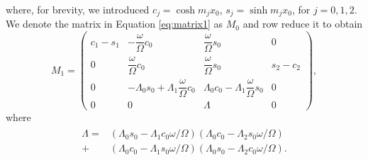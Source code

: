 %
where, for brevity, we introduced $c_j = \cosh m_j x_0$, $s_j = \sinh m_j x_0$, for $j = 0,1,2$.
We denote the matrix in Equation \eqref{eq:matrix1} as $M_0$ and row reduce it to obtain
%
\begin{equation}
\label{eq:matrix2}
M_1 = 
\begin{pmatrix}
c_1 - s_1 
& - \dfrac{\omega}{\Omega} c_0
& \dfrac{\omega}{\Omega} s_0
& 0
\\[0.3cm]
0
& \dfrac{\omega}{\Omega} c_0
& \dfrac{\omega}{\Omega} s_0
& s_2 - c_2
\\[0.3cm]
0
& - \Lambda_0 s_0 + \Lambda_1 \dfrac{\omega}{\Omega} c_0
& \Lambda_0 c_0 - \Lambda_1 \dfrac{\omega}{\Omega} s_0
& 0
\\[0.3cm]
0
& 0
& \Lambda
& 0
\end{pmatrix},
\end{equation}
%
where
%
\begin{align}
\begin{split}
\label{eq:lambda}
\Lambda = & \left(\Lambda_0 s_0 - \Lambda_1 c_0 \omega/\Omega \right)
\left(\Lambda_0 c_0 - \Lambda_2 s_0 \omega/\Omega \right)
\\
+ & \left(\Lambda_0 c_0 - \Lambda_1 s_0 \omega/\Omega \right)
\left( \Lambda_0 s_0 - \Lambda_2 c_0 \omega/\Omega \right).
\end{split}
\end{align}
%

